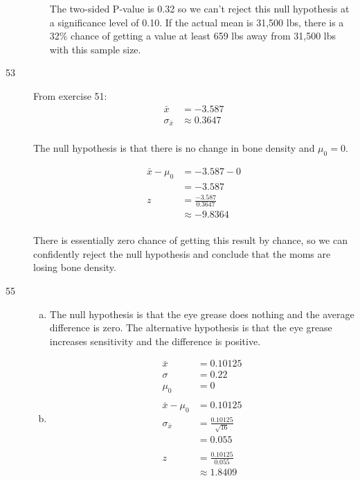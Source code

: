 \documentclass[letterpaper, landscape]{exam}
\begin{document}
\begin{description}
\begin{enumerate}[(a)]
            The two-sided P-value is 0.32 so we can't reject this null hypothesis
            at a significance level of 0.10. If the actual mean is 31,500 lbs,
            there is a 32\% chance of getting a value at least 659 lbs away from
            31,500 lbs with this sample size.

        \end{enumerate}

      \item[53]
        From exercise 51:
        \begin{align*}
            \bar{x}          & = -3.587 \\
            \sigma_{\bar{x}} & \approx 0.3647 \\
        \end{align*}

        The null hypothesis is that there is no change in bone density and
        $\mu_0 = 0$.

        \begin{align*}
          \bar{x} - \mu_0 & = -3.587 - 0 \\
                          & = -3.587 \\
          z & = \frac{-3.587}{0.3647} \\
            & \approx -9.8364 \\
        \end{align*}

        There is essentially zero chance of getting this result by chance,
        so we can confidently reject the null hypothesis and conclude that
        the moms are losing bone density.

      \newpage

      \item[55]
        \begin{enumerate}[(a)]
          \item The null hypothesis is that the eye grease does nothing and the
            average difference is zero. The alternative hypothesis is that the
            eye grease increases sensitivity and the difference is positive.

          \item
            \begin{align*}
              \bar{x} & = 0.10125 \\
              \sigma  & = 0.22 \\
              \mu_0   & = 0 \\
              \\
              \bar{x} - \mu_0  & = 0.10125 \\
              \sigma_{\bar{x}} & = \frac{0.10125}{\sqrt{16}} \\
                               & = 0.055 \\
              \\
              z & = \frac{0.10125}{0.055} \\
                & \approx 1.8409 \\
            \end{align*}


\end{enumerate}
\end{description}
\end{document}
